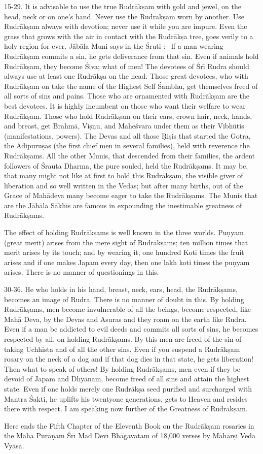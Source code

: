 15-29. It is advisable to use the true Rudr\=ak\d{s}am with gold and jewel, on the head, neck or on one's hand. Never use the Rudr\=ak\d{s}am worn by another. Use Rudr\=ak\d{s}am always with devotion; never use it while you are impure. Even the grass that grows with the air in contact with the Rudr\=ak\d{s}a tree, goes verily to a holy region for ever. J\=ab\=ala Muni says in the \'Sruti :-- lf a man wearing Rudr\=ak\d{s}am commits a sin, he gets deliverance from that sin. Even if animals hold Rudr\=ak\d{s}am, they become \'Siva; what of men! The devotees of \'Sr\={\i} Rudra should always use at least one Rudr\=ak\d{s}a on the head. Those great devotees, who with Rudr\=ak\d{s}am on take the name of the Highest Self \'Sambhu, get themselves freed of all sorts of sins and pains. Those who are ornamented with Rudr\=ak\d{s}am are the best devotees. It is highly incumbent on those who want their welfare to wear Rudr\=ak\d{s}am. Those who hold Rudr\=ak\d{s}am on their ears, crown hair, neck, hands, and breast, get Brahm\=a, Vi\d{s}\d{n}u, and Mahe\'svara under them as their Vibh\=utis (manifestations, powers). The Devas and all those \d{R}i\d{s}is that started the Gotra, the \=Adipuru\d{s}as (the first chief men in several families), held with reverence the Rudr\=ak\d{s}ams. All the other Munis, that descended from their families, the ardent followers of \'Srauta Dharma, the pure souled, held the Rudr\=ak\d{s}ams. It may be, that many might not like at first to hold this Rudr\=ak\d{s}am, the visible giver of liberation and so well written in the Vedas; but after many births, out of the Grace of Mah\=adeva many become eager to take the Rudr\=ak\d{s}ams. The Munis that are the J\=ab\=ala S\=akh\={\i}s are famous in expounding the inestimable greatness of Rudr\=ak\d{s}ams.

The effect of holding Rudr\=ak\d{s}ams is well known in the three worlds. Pu\d{n}yam (great merit) arises from the mere sight of Rudr\=ak\d{s}ams; ten million times that merit arises by its touch; and by wearing it, one hundred Koti times the fruit arises and if one makes Japam every day, then one lakh koti times the pu\d{n}yam arises. There is no manner of questionings in this.

30-36. He who holds in his hand, breast, neck, ears, head, the Rudr\=ak\d{s}ams, becomes an image of Rudra. There is no manner of doubt in this. By holding Rudr\=ak\d{s}ams, men become invulnerable of all the beings, become respected, like Mah\=a Deva, by the Devas and Asuras and they roam on the earth like Rudra. Even if a man be addicted to evil deeds and commits all sorts of sins, he becomes respected by all, on holding Rudr\=ak\d{s}ams. By this men are freed of the sin of taking Uchhista and of all the other sins. Even if you suspend a Rudr\=ak\d{s}am rosary on the neck of a dog and if that dog dies in that state, he gets liberation! Then what to speak of others! By holding Rudr\=ak\d{s}ams, men even if they be devoid of Japam and Dhy\=anam, become freed of all sins and attain the highest state. Even if one holds merely one Rudr\=ak\d{s}a seed purified and surcharged with Mantra \'Sakti, he uplifts his twentyone generations, gets to Heaven and resides there with respect. I am speaking now further of the Greatness of Rudr\=ak\d{s}am.

Here ends the Fifth Chapter of the Eleventh Book on the Rudr\=ak\d{s}am rosaries in the Mah\=a Pur\=a\d{n}am \'Sr\={\i} Mad Dev\={\i} Bh\=agavatam of 18,000 verses by Mah\=ar\d{s}i Veda Vy\=asa.



